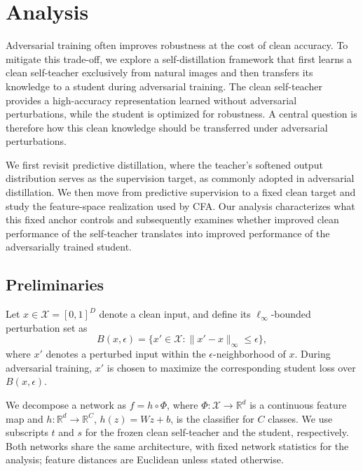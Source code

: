 \documentclass{article} %
\theoremstyle{plain}
\begin{document}
\section{Analysis}
\label{sec:analysis}

Adversarial training often improves robustness at the cost of clean accuracy.
To mitigate this trade-off, we explore a self-distillation framework that
first learns a clean self-teacher exclusively from natural images and then
transfers its knowledge to a student during adversarial training.
The clean self-teacher provides a high-accuracy representation learned without
adversarial perturbations, while the student is optimized for robustness.
A central question is therefore how this clean knowledge should be transferred
under adversarial perturbations.

We first revisit predictive distillation, where the teacher's softened output
distribution serves as the supervision target, as commonly adopted in
adversarial distillation.
We then move from predictive supervision to a fixed clean target and study the
feature-space realization used by CFA.
Our analysis characterizes what this fixed anchor controls and subsequently
examines whether improved clean performance of the self-teacher translates
into improved performance of the adversarially trained student.


\subsection{Preliminaries}

Let \(x\in\mathcal X=[0,1]^D\) denote a clean input, and define its
\(\ell_\infty\)-bounded perturbation set as
\begin{equation}
B(x,\epsilon)
=
\{x'\in\mathcal X:
\lVert x'-x\rVert_\infty\le\epsilon\},
\end{equation}
where \(x'\) denotes a perturbed input within the \(\epsilon\)-neighborhood
of \(x\).
During adversarial training, \(x'\) is chosen to maximize the corresponding
student loss over \(B(x,\epsilon)\).

We decompose a network as \(f=h\circ\Phi\), where
\(\Phi:\mathcal X\to\mathbb R^d\) is a continuous feature map and
\(h:\mathbb R^d\to\mathbb R^C\), \(h(z)=Wz+b\), is the classifier for
\(C\) classes.
We use subscripts \(t\) and \(s\) for the frozen clean self-teacher and the
student, respectively.
Both networks share the same architecture, with fixed network statistics for
the analysis; feature distances are Euclidean unless stated otherwise.
\end{document}
